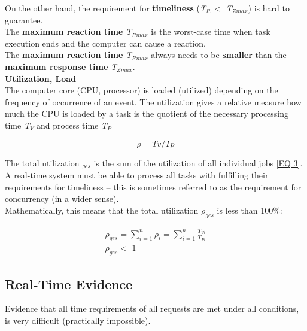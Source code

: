 On the other hand, the requirement for \textbf{timeliness} (\textit{T${}_{R\ }$}$\mathrm{<}$ \textit{T${}_{Zmax}$}) is hard to guarantee. \\

The \textbf{maximum reaction time} \textit{T${}_{Rmax}$} is the worst-case time when task execution ends and the computer can cause a reaction. \\

The \textbf{maximum reaction time} \textit{T${}_{Rmax}$} always needs to be \textbf{smaller} than the \textbf{maximum response time} \textit{T${}_{Zmax}$}.\\

{\rot\bf Utilization, Load}\\

The computer core (CPU, processor) is loaded (utilized) depending on the frequency of occurrence of an event. The utilization  gives a relative measure how much the CPU is loaded by a task is the quotient of the necessary processing time \textit{T${}_{V}$} and process time \textit{T${}_{P}$}

\begin{equation}
	\rho = Tv/Tp
\label{EQ 2}
\end{equation}
	
The total utilization ${}_{ges}$ is the sum of the utilization of all individual jobs \ref{EQ 3}. A real-time system must be able to process all tasks with fulfilling their requirements for timeliness -- this is sometimes referred to as the requirement for concurrency (in a wider sense).\\

 Mathematically, this means that the total utilization \textit{${\rho}_{ges}$} is less than 100\%:

\begin{equation}
	\begin{array}{l} {\rho _{ges} =\sum _{i=1}^{n}\rho _{i} = \sum _{i=1}^{n}\frac{T_{Vi} }{T_{Pi} }  } \\ {\rho _{ges} <\, \, 1} \end{array}
\label{EQ 3}
\end{equation}

\subsection{Real-Time Evidence}

Evidence that all time requirements of all requests are met under all conditions, is very difficult (practically impossible). \\

